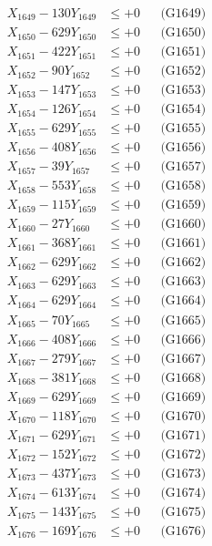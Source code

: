 \documentclass[a4paper,10pt]{article}
\begin{document}
{\begin{align}
X_{1649} - 130Y_{1649} &\leq +0 && \text{(G1649)} \\
X_{1650} - 629Y_{1650} &\leq +0 && \text{(G1650)} \\
\allowbreak
X_{1651} - 422Y_{1651} &\leq +0 && \text{(G1651)} \\
X_{1652} - 90Y_{1652} &\leq +0 && \text{(G1652)} \\
X_{1653} - 147Y_{1653} &\leq +0 && \text{(G1653)} \\
X_{1654} - 126Y_{1654} &\leq +0 && \text{(G1654)} \\
X_{1655} - 629Y_{1655} &\leq +0 && \text{(G1655)} \\
X_{1656} - 408Y_{1656} &\leq +0 && \text{(G1656)} \\
X_{1657} - 39Y_{1657} &\leq +0 && \text{(G1657)} \\
X_{1658} - 553Y_{1658} &\leq +0 && \text{(G1658)} \\
X_{1659} - 115Y_{1659} &\leq +0 && \text{(G1659)} \\
X_{1660} - 27Y_{1660} &\leq +0 && \text{(G1660)} \\
\allowbreak
X_{1661} - 368Y_{1661} &\leq +0 && \text{(G1661)} \\
X_{1662} - 629Y_{1662} &\leq +0 && \text{(G1662)} \\
X_{1663} - 629Y_{1663} &\leq +0 && \text{(G1663)} \\
X_{1664} - 629Y_{1664} &\leq +0 && \text{(G1664)} \\
X_{1665} - 70Y_{1665} &\leq +0 && \text{(G1665)} \\
X_{1666} - 408Y_{1666} &\leq +0 && \text{(G1666)} \\
X_{1667} - 279Y_{1667} &\leq +0 && \text{(G1667)} \\
X_{1668} - 381Y_{1668} &\leq +0 && \text{(G1668)} \\
X_{1669} - 629Y_{1669} &\leq +0 && \text{(G1669)} \\
X_{1670} - 118Y_{1670} &\leq +0 && \text{(G1670)} \\
\allowbreak
X_{1671} - 629Y_{1671} &\leq +0 && \text{(G1671)} \\
X_{1672} - 152Y_{1672} &\leq +0 && \text{(G1672)} \\
X_{1673} - 437Y_{1673} &\leq +0 && \text{(G1673)} \\
X_{1674} - 613Y_{1674} &\leq +0 && \text{(G1674)} \\
X_{1675} - 143Y_{1675} &\leq +0 && \text{(G1675)} \\
X_{1676} - 169Y_{1676} &\leq +0 && \text{(G1676)} \\

\end{align}}
\end{document}
